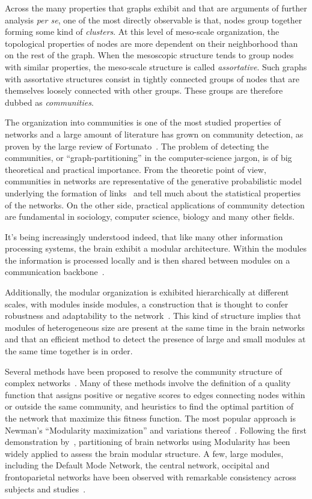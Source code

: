 \bigbreak
Across the many properties that graphs exhibit and that are arguments of further analysis \emph{per se}, one of the most directly observable is that, nodes group together forming some kind of \emph{clusters}.
At this level of meso-scale organization, the topological properties of nodes are more dependent on their neighborhood than on the rest of the graph. When the mesoscopic structure tends to group nodes with similar properties, the meso-scale structure is called \emph{assortative}. Such graphs with assortative structures consist in tightly connected groups of nodes that are themselves loosely connected with other groups. These groups are therefore dubbed as \emph{communities}. 

The organization into communities is one of the most studied properties of networks and a large amount of literature has grown on community detection, as proven by the large review of Fortunato~\cite{fortunato2010}.
The problem of detecting the communities, or ``graph-partitioning'' in the computer-science jargon, is of big theoretical and practical importance.
From the theoretic point of view, communities in networks are representative of the generative probabilistic model underlying the formation of links~\cite{Karrer2011} and tell much about the statistical properties of the networks.
On the other side, practical applications of community detection are fundamental in sociology, computer science, biology and many other fields.

It's being increasingly understood indeed, that like many other information processing systems, the brain exhibit a modular architecture.
Within the modules the information is processed locally and is then shared between modules on a communication backbone~\cite{DeReus2013a,VandenHeuvel2013a}.

Additionally, the modular organization is exhibited hierarchically at different scales, with modules inside modules, a construction that is thought to confer robustness and adaptability to the network~\cite{meunier2010}. This kind of structure implies that modules of heterogeneous size are present at the same time in the brain networks and that an efficient method to detect the presence of large and small modules at the same time together is in order.

Several methods have been proposed to resolve the community structure of complex networks~\cite{fortunato2010,lancichinetti2009}.
Many of these methods involve the definition of a quality function that assigns positive or negative scores to edges connecting nodes within or outside the same community, and heuristics to find the optimal partition of the network that maximize this fitness function. The most popular approach is Newman's ``Modularity maximization'' and variations thereof~\cite{newman2006}.
Following the first demonstration by~\cite{schwarz2008}, partitioning of brain networks using Modularity has been widely applied to assess the brain modular structure.
A few, large modules, including the Default Mode Network, the central network, occipital and frontoparietal networks have been observed with remarkable consistency across subjects and studies~\cite{meunier2010,wang2010}. 

